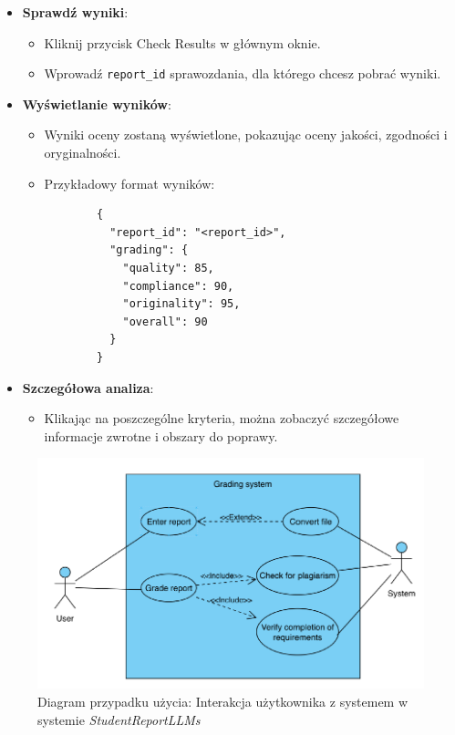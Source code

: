 \documentclass[a4paper, 12pt]{article}
\begin{document}
\begin{itemize}
    \item \textbf{Sprawdź wyniki}:
    \begin{itemize}
        \item Kliknij przycisk Check Results w głównym oknie.
        \item Wprowadź \texttt{report\_id} sprawozdania, dla którego chcesz pobrać wyniki.
    \end{itemize}
    \item \textbf{Wyświetlanie wyników}:
    \begin{itemize}
        \item Wyniki oceny zostaną wyświetlone, pokazując oceny jakości, zgodności i oryginalności.
        \item Przykładowy format wyników:
        \begin{verbatim}
        {
          "report_id": "<report_id>",
          "grading": {
            "quality": 85,
            "compliance": 90,
            "originality": 95,
            "overall": 90
          }
        }
        \end{verbatim}
    \end{itemize}
    \item \textbf{Szczegółowa analiza}:
    \begin{itemize}
        \item Klikając na poszczególne kryteria, można zobaczyć szczegółowe informacje zwrotne i obszary do poprawy.
    \end{itemize}
\end{itemize}

\begin{figure}[H]
    \centering
    \includegraphics[width=\textwidth]{img/usecase_diagram}
    \caption{Diagram przypadku użycia: Interakcja użytkownika z systemem w systemie \textit{StudentReportLLMs}}
    \label{fig:use-case-diagram}
\end{figure}
\end{document}
